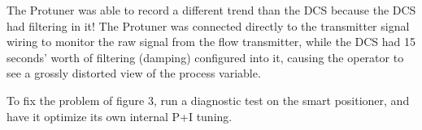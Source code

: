 \vskip 10pt

The Protuner was able to record a different trend than the DCS because the DCS had filtering in it!  The Protuner was connected directly to the transmitter signal wiring to monitor the raw signal from the flow transmitter, while the DCS had 15 seconds' worth of filtering (damping) configured into it, causing the operator to see a grossly distorted view of the process variable.

\vskip 10pt

To fix the problem of figure 3, run a diagnostic test on the smart positioner, and have it optimize its own internal P+I tuning.









